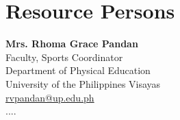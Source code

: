 %
%
%                 

\chapter{Resource Persons}
\label{sec:appendixb}

%
%
%
%

\newcommand{\resperson}[5]{\textbf{#1} \\ #2 \\ #3 \\ #4 \\ \url{#5}\vspace{0.5em}\\}

\resperson{Mrs. Rhoma Grace Pandan}{Faculty, Sports Coordinator}{Department of Physical Education}{University of the Philippines Visayas}{rvpandan@up.edu.ph}
....

